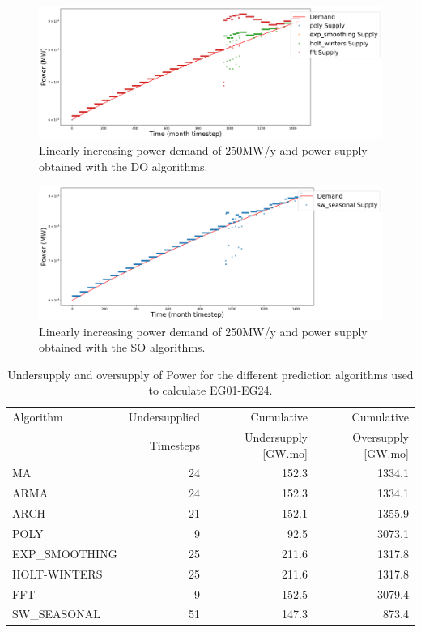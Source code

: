 \documentclass[11pt]{article}
\begin{document}
\begin{figure}[H]
	\centering
	\includegraphics[width=\textwidth]{30-figures/lin-30-power-buffer02.png} 
	\hfill
	\caption{Linearly increasing power demand of 250MW/y and power supply obtained with the DO algorithms.}
	\label{fig:30-lin-DO}
\end{figure}

\begin{figure}[H]
	\centering
	\includegraphics[width=\textwidth]{30-figures/lin-30-power-buffer03.png} 
	\hfill
	\caption{Linearly increasing power demand of 250MW/y and power supply obtained with the SO algorithms.}
	\label{fig:30-lin-SO}
\end{figure}

\begin{table}[H]
	\centering
	\caption{Undersupply and oversupply of Power for the different prediction algorithms used to calculate EG01-EG24.}
	\label{tab:30-lin-power}
	\begin{tabularx}{\textwidth}{lRRR}
		\hline
		Algorithm & Undersupplied & Cumulative  & Cumulative \\
		& Timesteps     & Undersupply [GW.mo]  & Oversupply [GW.mo] \\ \hline
		MA        & 24 & 152.3 & 1334.1 \\ 
		ARMA      & 24 & 152.3 & 1334.1 \\ 
		ARCH      & 21 & 152.1 & 1355.9 \\ 
		POLY      &  9 & 92.5 & 3073.1 \\ 
		EXP\_SMOOTHING 	& 25 & 211.6 & 1317.8 \\ 
		HOLT-WINTERS  	& 25 & 211.6 & 1317.8 \\ 
		FFT       & 9 & 152.5 & 3079.4 \\ 
		SW\_SEASONAL  & 51 & 147.3 & 873.4 \\ \hline
	\end{tabularx}
\end{table}
\end{document}
